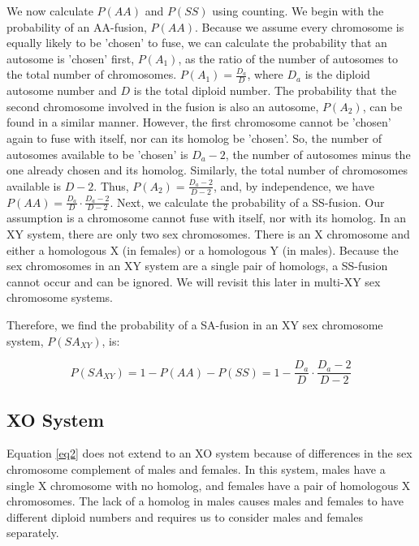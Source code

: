 \documentclass[12pt]{article}
\begin{document}
We now calculate $P(AA)$ and $P(SS)$ using counting.
We begin with the probability of an AA-fusion, $P(AA)$.
Because we assume every chromosome is equally likely to be 'chosen' to fuse, we can calculate the probability that an autosome is 'chosen' first, $P(A_1)$, as the ratio of the number of autosomes to the total number of chromosomes. 
$P(A_1) = \frac{D_a}{D}$, where $D_a$ is the diploid autosome number and $D$ is the total diploid number.
The probability that the second chromosome involved in the fusion is also an autosome, $P(A_2)$, can be found in a similar manner.
However, the first chromosome cannot be 'chosen' again to fuse with itself, nor can its homolog be 'chosen'. 
So, the number of autosomes available to be 'chosen' is $D_a - 2$, the number of autosomes minus the one already chosen and its homolog.
Similarly, the total number of chromosomes available is $D - 2$. 
Thus, $P(A_2) = \frac{D_a - 2}{D - 2}$, and, by independence, we have $P(AA) = \frac{D_a}{D} \cdot \frac{D_a - 2}{D - 2}$.
Next, we calculate the probability of a SS-fusion. 
Our assumption is a chromosome cannot fuse with itself, nor with its homolog. 
In an XY system, there are only two sex chromosomes. 
There is an X chromosome and either a homologous X (in females) or a homologous Y (in males).
Because the sex chromosomes in an XY system are a single pair of homologs, a SS-fusion cannot occur and can be ignored. 
We will revisit this later in multi-XY sex chromosome systems.

Therefore, we find the probability of a SA-fusion in an XY sex chromosome system, $P(SA_{XY})$, is:

\begin{equation} \label{eq2}
    P(SA_{XY}) = 1 - P(AA) - P(SS) = 1 - \frac{D_a}{D} \cdot \frac{D_a - 2}{D - 2}
\end{equation}

\subsection{XO System}
Equation \ref{eq2} does not extend to an XO system because of differences in the sex chromosome complement of males and females. 
In this system, males have a single X chromosome with no homolog, and females have a pair of homologous X chromosomes. 
The lack of a homolog in males causes males and females to have different diploid numbers and requires us to consider males and females separately. 
\end{document}
